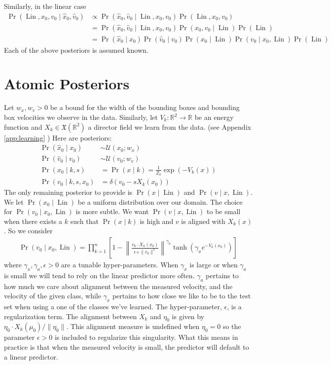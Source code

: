\documentclass[12pt]{amsart}
\DeclareMathOperator{\Lin}{Lin}
\begin{document}
Similarly, in the linear case
\begin{align*}
	\Pr( \Lin , x_0, v_0 \mid \hat{x}_0, \hat{v}_0 ) &\propto \Pr( \hat{x}_0, \hat{v}_0 \mid \Lin, x_0, v_0 ) \Pr( \Lin, x_0, v_0 ) \\
	&= \Pr( \hat{x}_0, \hat{v}_0 \mid \Lin, x_0, v_0 ) \Pr( x_0, v_0 \mid \Lin ) \Pr(\Lin) \\
	&= \Pr( \hat{x}_0 \mid x_0 ) \Pr( \hat{v}_0 \mid v_0 ) \Pr( x_0 \mid \Lin ) \Pr( v_0 \mid x_0, \Lin ) \Pr(\Lin)
\end{align*}
Each of the above posteriors is assumed known.

\appendix

\section{Atomic Posteriors}
Let $w_x, w_v  > 0$ be a bound for the width of the bounding boxes and bounding box velocities we observe in the data.
Similarly, let $V_k: \mathbb{R}^2 \to \mathbb{R}$ be an energy function and $X_k \in \mathfrak{X}( \mathbb{R}^2)$ a director field we learn from the data. (see Appendix \ref{app:learning} )
Here are posteriors:
\begin{align*}
	\Pr( \hat{x}_0 \mid x_0 ) &\sim \mathcal{U}( x_0 ; w_x ) \\
	\Pr( \hat{v}_0 \mid v_0 ) &\sim \mathcal{U}( v_0 ; w_v ) \\
	\Pr( x_0 \mid k,s ) &= \Pr(x \mid k) = \frac{1}{Z_k} \exp \left( -V_k(x) \right) \\
	\Pr( v_0 \mid k,s,x_0) &= \delta( v_0 - s X_k(x_0) )
\end{align*}
The only remaining posterior to provide is $\Pr( x \mid \Lin )$ and $\Pr( v \mid x,\Lin )$.
We let $\Pr( x_0 \mid \Lin)$ be a uniform distribution over our domain.
The choice for $\Pr( v_0 \mid x_0,\Lin)$ is more subtle.
We want $\Pr(v \mid x, \Lin )$ to be small when there exists a $k$ such that $\Pr(x \mid k)$ is high and $v$ is aligned with $X_k(x)$.
So we consider 
\begin{align}
	\Pr( v_0 \mid x_0 , \Lin ) = \prod_{k=1}^n \left[ 1 - \left\| \frac{ v_0 \cdot X_{k}(x_0) }{ \epsilon + \| v_0 \|^2} \right\|^{\gamma_a} \tanh \left( \gamma_x e^{ - V_{k}(x_0) } \right)  \right] \label{eq:v given x and Linear}
\end{align}
where $\gamma_x, \gamma_a, \epsilon > 0$ are a tunable hyper-parameters.
When $\gamma_x$ is large or when $\gamma_a$ is small we will tend to rely on the linear predictor more often.
$\gamma_a$ pertains to how much we care about alignment between the measured velocity, and the velocity of the given class, while $\gamma_x$ pertains to how close we like to be to the test set when using a one of the classes we've learned.
The hyper-parameter, $\epsilon$, is a regularization term.  The alignment between $X_{k}$ and $\eta_0$ is given by $\eta_0 \cdot X_{k}(\mu_0) / \| \eta_0 \|$.  This alignment measure is undefined when $\eta_0 = 0$ so the parameter $\epsilon > 0$ is included to regularize this singularity.  What this means in practice is that when the measured velocity is small, the predictor will default to a linear predictor.
\end{document}
